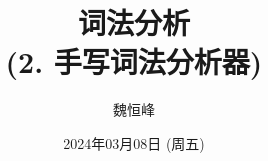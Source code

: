 \documentclass[]{beamer}
\title[词法分析]{词法分析 \\ (2. 手写词法分析器)}
\author[魏恒峰]{\large 魏恒峰}
\institute{hfwei@nju.edu.cn}
\date{2024年03月08日 (周五)}
\begin{document}
\maketitle


\thankyou{}

\end{document}
